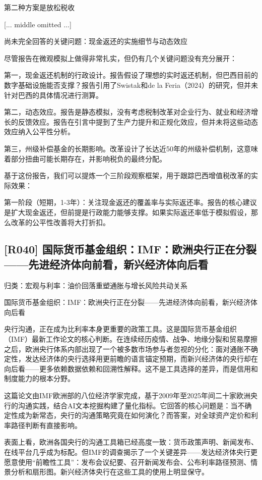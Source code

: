 \documentclass[11pt]{ctexart}
\begin{document}
第二种方案是放松税收

[... middle omitted ...]

尚未完全回答的关键问题：现金返还的实施细节与动态效应

尽管报告在微观模拟上做得非常扎实，但仍有几个关键问题没有充分展开：

第一，现金返还机制的行政设计。报告假设了理想的实时返还机制，但巴西目前的数字基础设施能否支撑？报告引用了Swistak和de la Feria（2024）的研究，但并未针对巴西的具体情况进行测算。

第二，动态效应。报告是静态模拟，没有考虑税制改革对企业行为、就业和经济增长的反馈效应。报告在引言中提到了生产力提升和正规化效应，但并未将这些动态效应纳入公平性分析。

第三，州级补偿基金的长期影响。改革设计了长达近50年的州级补偿机制，这意味着部分扭曲可能长期存在，并影响税负的最终分配。

基于这份报告，我们可以提炼一个三阶段观察框架，用于跟踪巴西增值税改革的实际效果：

第一阶段（短期，1-3年）：关注现金返还的覆盖率与实际返还率。报告的核心建议是扩大现金返还，但前提是行政能力能够支撑。如果实际返还率低于模拟假设，那么改革的公平性改善将大打折扣。

\subsection{[R040] 国际货币基金组织：IMF：欧洲央行正在分裂——先进经济体向前看，新兴经济体向后看}
{\small\color{refgray}归类：宏观与利率：油价回落重塑通胀与增长风险共动关系}

国际货币基金组织：IMF：欧洲央行正在分裂——先进经济体向前看，新兴经济体向后看

央行沟通，正在成为比利率本身更重要的政策工具。这是国际货币基金组织（IMF）最新工作论文的核心判断。在连续经历疫情、战争、地缘分裂和贸易摩擦之后，欧洲央行体系内部出现了一个被多数市场参与者忽视的分化：面对通胀不确定性，发达经济体的央行选择用更前瞻的语言锚定预期，而新兴经济体的央行却在向后看——更多依赖数据依赖和回溯性解释。这不是工具选择的差异，而是信用和制度能力的根本分野。

这篇论文由IMF欧洲部的八位经济学家完成，基于2009年至2025年间二十家欧洲央行的沟通实践，结合AI文本挖掘构建了量化指标。它回答的核心问题是：当不确定性成为新常态，央行的沟通策略究竟在如何演化？而答案，对全球资产定价和利率路径判断有直接影响。

表面上看，欧洲各国央行的沟通工具箱已经高度一致：货币政策声明、新闻发布、在线平台几乎成为标配。但IMF的调查揭示了一个关键差异——发达经济体央行更愿意使用“前瞻性工具”：发布会议纪要、召开新闻发布会、公布利率路径预测、情景分析和扇形图。新兴经济体央行在这些工具的使用上明显保守。
\end{document}
